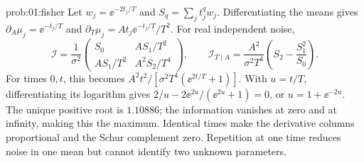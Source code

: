 \begin{solution}{prob:01:fisher}
Let \(w_j=\ee^{-2t_j/T}\) and \(S_q=\sum_jt_j^qw_j\). Differentiating the means gives
\(\partial_A\mu_j=\ee^{-t_j/T}\) and
\(\partial_T\mu_j=A t_j\ee^{-t_j/T}/T^2\).
For real independent noise,
\[
 \mathcal I=\frac1{\sigma^2}
 \begin{pmatrix}S_0&A S_1/T^2\\A S_1/T^2&A^2S_2/T^4\end{pmatrix},
 \qquad
 \mathcal I_{T\mid A}=\frac{A^2}{\sigma^2T^4}
 \left(S_2-\frac{S_1^2}{S_0}\right).
\]
For times \(0,t\), this becomes \(A^2t^2/[\sigma^2T^4(\ee^{2t/T}+1)]\).
With \(u=t/T\), differentiating its logarithm gives
\(2/u-2\ee^{2u}/(\ee^{2u}+1)=0\), or
\(u=1+\ee^{-2u}\). The unique positive root is \(1.10886\); the information vanishes at zero and at infinity, making this the maximum.
Identical times make the derivative columns proportional and the Schur complement zero. Repetition at one time reduces noise in one mean but cannot identify two unknown parameters.
\end{solution}
